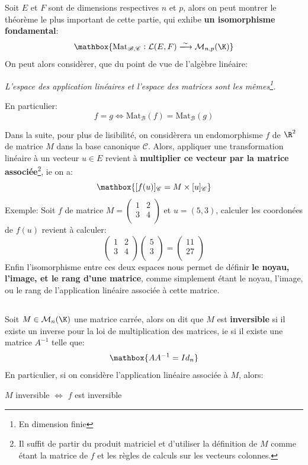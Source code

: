 Soit \(E\) et \(F\) sont de dimensions respectives \(n\) et \(p\), alors on peut montrer le théorème le plus important de cette partie, qui exhibe \textbf{un isomorphisme fondamental}:
\[
   \mathbox{
      \text{Mat}_{\mathscr{B, C}} : \mathcal{L}(E, F) \xlongrightarrow{\sim} \mathcal{M}_{n, p}(\K)  
   }
\]
On peut alors considèrer, que du point de vue de l'algèbre linéaire:
\begin{center}
   \textit{L'espace des application linéaires et l'espace des matrices sont les mêmes\footnote[1]{En dimension finie}.}
\end{center}
En particulier:
\[
   f = g \Longleftrightarrow \text{Mat}_{\mathscr{B}}(f) = \text{Mat}_{\mathscr{B}}(g)
\]

Dans la suite, pour plus de lisibilité, on considèrera un endomorphisme \(f\) de \(\R^2\) de matrice \(M\) dans la base canonique \(\mathscr{C}\).
Alors, appliquer une transformation linéaire à un vecteur \(u \in E\) revient à \textbf{multiplier ce vecteur par la matrice associée}\footnote[2]{Il suffit de partir du produit matriciel et d'utiliser la définition de \(M\) comme étant la matrice de \(f\) et les règles de calculs sur les vecteurs colonnes.}, ie on a:
\[
   \mathbox{
      [f(u)]_{\mathscr{C}} = M \times [u]_{\mathscr{C}}
   }
\]
Exemple: Soit \(f\) de matrice 
\(M = \begin{pmatrix}
   1 & 2\\
   3 & 4\\
\end{pmatrix}\) 
et \(u = (5, 3)\), calculer les coordonées de \(f(u)\) revient à calculer:
\[
   \begin{pmatrix}
      1 & 2\\
      3 & 4\\
   \end{pmatrix}
   \begin{pmatrix}
      5 \\
      3 \\
   \end{pmatrix} =
   \begin{pmatrix}
      11 \\
      27 \\
   \end{pmatrix} 
\]
Enfin l'isomorphisme entre ces deux espaces nous permet de définir \textbf{le noyau, l'image, et le rang d'une matrice}, comme simplement étant le noyau, l'image, ou le rang de l'application linéaire associée à cette matrice.

\subsection*{}
Soit \(M \in \mathcal{M}_n(\K)\) une matrice carrée, alors on dit que \(M\) est \textbf{inversible} si il existe un inverse pour la loi de multiplication des matrices, ie si il existe une matrice \(A^{-1}\) telle que:
\[
   \mathbox{AA^{-1}=Id_n}   
\]
En particulier, si on considère l'application linéaire associée à \(M\), alors:
\begin{center}
   \(M\) inversible \(\Longleftrightarrow\) \(f\) est inversible
\end{center}\<

